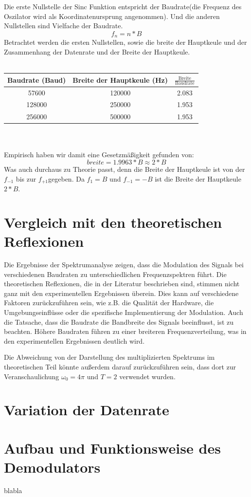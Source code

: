 Die erste Nullstelle der Sinc Funktion entspricht der Baudrate(die Frequenz des Oszilator wird als Koordinatenursprung angenommen).
Und die anderen Nullstellen sind Vielfache der Baudrate.
\begin{equation}
    f_n = n * B
\end{equation}
Betrachtet werden die ersten Nullstellen, sowie die breite der Hauptkeule und der Zusammenhang der Datenrate und der Breite der Hauptkeule.
\\
\\
\begin{tabular}{|c|c|c|}
    \hline
    Baudrate (Baud) & Breite der Hauptkeule (Hz)& $\frac{\text{Breite}}{\text{Baudrate}}$  \\
    \hline
    57600 & 120000 & 2.083 \\
    128000 & 250000 & 1.953 \\
    256000 & 500000 & 1.953 \\
    \hline
\end{tabular}
\\
\\
Empirisch haben wir damit eine Gesetzmäßigkeit gefunden von:
\begin{equation}
    breite = 1.9963 * B \approx 2 * B
\end{equation}
Was auch durchaus zu Theorie passt, denn die Breite der Hauptkeule ist von der $f_{-1}$ bis zur $f_{+1}$gegeben.
Da $f_{1} = B$ und $f_{-1} = -B$ ist die Breite der Hauptkeule $2 * B$.

\section{Vergleich mit den theoretischen Reflexionen}
Die Ergebnisse der Spektrumanalyse zeigen, dass die Modulation des Signals bei verschiedenen Baudraten zu unterschiedlichen Frequenzspektren führt. Die theoretischen Reflexionen, die in der Literatur beschrieben sind, stimmen nicht ganz mit den experimentellen Ergebnissen überein. Dies kann auf verschiedene Faktoren zurückzuführen sein, wie z.B. die Qualität der Hardware, die Umgebungseinflüsse oder die spezifische Implementierung der Modulation. Auch die Tatsache, dass die Baudrate die Bandbreite des Signals beeinflusst, ist zu beachten. Höhere Baudraten führen zu einer breiteren Frequenzverteilung, was in den experimentellen Ergebnissen deutlich wird. 

Die Abweichung von der Darstellung des multiplizierten Spektrums im theoretischen Teil könnte außerdem darauf zurückzuführen sein, dass dort zur Veranschaulichung $\omega_0 = 4\pi$ und $T = 2$ verwendet wurden.

\section{Variation der Datenrate}
\section{Aufbau und Funktionsweise des Demodulators}
blabla
\clearpage